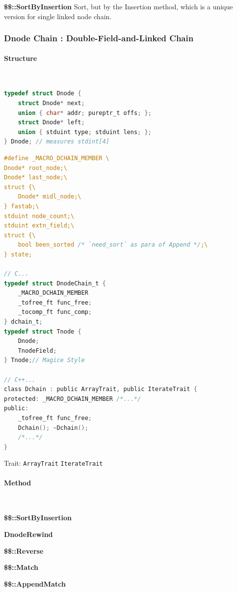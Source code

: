 \textbf{\$\$::SortByInsertion} Sort, but by the Insertion method, which is a unique version for single linked node chain.





\subsubsection{Dnode Chain : Double-Field-and-Linked Chain}



\paragraph{Structure} \

\begin{lstlisting}[language=C]
typedef struct Dnode {
	struct Dnode* next;
	union { char* addr; pureptr_t offs; };
	struct Dnode* left;
	union { stduint type; stduint lens; };
} Dnode; // measures stdint[4]
\end{lstlisting}

\begin{lstlisting}[language=C]
#define _MACRO_DCHAIN_MEMBER \
Dnode* root_node;\
Dnode* last_node;\
struct {\
	Dnode* midl_node;\
} fastab;\
stduint node_count;\
stduint extn_field;\
struct {\
	bool been_sorted /* `need_sort` as para of Append */;\
} state;
	
// C...
typedef struct DnodeChain_t {
	_MACRO_DCHAIN_MEMBER
	_tofree_ft func_free;
	_tocomp_ft func_comp;
} dchain_t;
typedef struct Tnode {
	Dnode;
	TnodeField;
} Tnode;// Magice Style
	
// C++...
class Dchain : public ArrayTrait, public IterateTrait {
protected: _MACRO_DCHAIN_MEMBER /*...*/
public:
	_tofree_ft func_free;
	Dchain(); ~Dchain();
	/*...*/
}
\end{lstlisting}

Trait:  \verb|ArrayTrait| \verb|IterateTrait|



\paragraph{Method} \

\textbf{\$\$::SortByInsertion}

\textbf{DnodeRewind}

\textbf{\$\$::Reverse}

\textbf{\$\$::Match}

\textbf{\$\$::AppendMatch}

